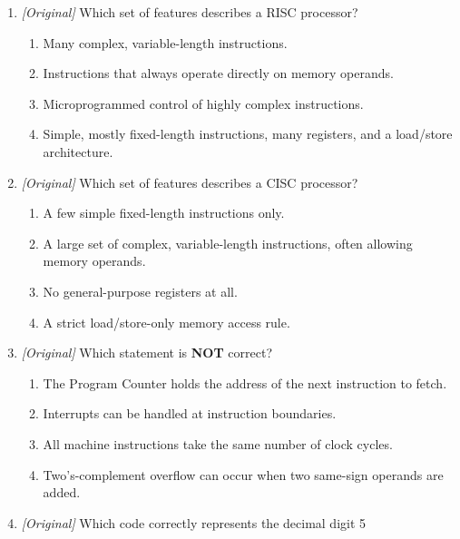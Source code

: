 \documentclass[11pt]{article}
\begin{document}
\begin{enumerate}[label=\textbf{Q\arabic*.}, leftmargin=*]
\begin{enumerate}[label=\Alph*.]
      Instruction Set Computer
    \item RISC = Rapid Instruction Set Computer; CISC = Complex Instruction
      Set Computer
    \item RISC = Reduced Integer Storage Cache; CISC = Central Instruction
      Set Computer
    \item RISC = Random Instruction Set Computing; CISC = Common Instruction
      Set Computer
  \end{enumerate}
\item \textit{[Original]} Which set of features describes a RISC processor?
  \begin{enumerate}[label=\Alph*.]
    \item Many complex, variable-length instructions.
    \item Instructions that always operate directly on memory operands.
    \item Microprogrammed control of highly complex instructions.
    \item Simple, mostly fixed-length instructions, many registers, and a
      load/store architecture.
  \end{enumerate}
\item \textit{[Original]} Which set of features describes a CISC processor?
  \begin{enumerate}[label=\Alph*.]
    \item A few simple fixed-length instructions only.
    \item A large set of complex, variable-length instructions, often
      allowing memory operands.
    \item No general-purpose registers at all.
    \item A strict load/store-only memory access rule.
  \end{enumerate}
\item \textit{[Original]} Which statement is \textbf{NOT} correct?
  \begin{enumerate}[label=\Alph*.]
    \item The Program Counter holds the address of the next instruction to
      fetch.
    \item Interrupts can be handled at instruction boundaries.
    \item All machine instructions take the same number of clock cycles.
    \item Two's-complement overflow can occur when two same-sign operands are
      added.
  \end{enumerate}
\item \textit{[Original]} Which code correctly represents the decimal digit 5

\end{enumerate}
\end{document}
